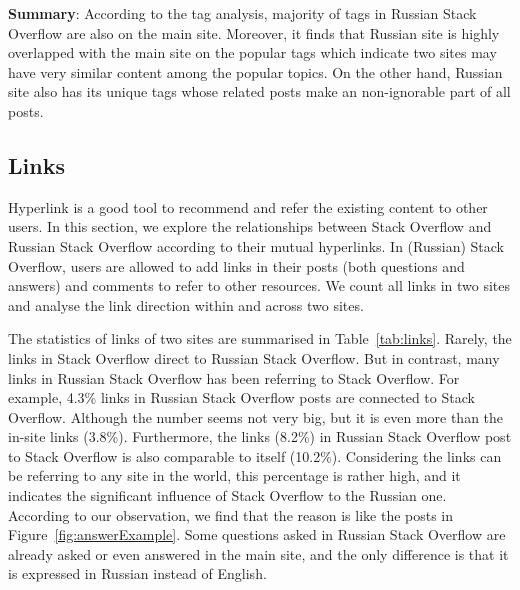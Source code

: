 \textbf{Summary}:
According to the tag analysis, majority of tags in Russian Stack Overflow are also on the main site. Moreover, it finds that Russian site is highly overlapped with the main site on the popular tags which indicate two sites may have very similar content among the popular topics. On the other hand, Russian site also has its unique tags whose related posts make an non-ignorable part of all posts. 


\subsection{Links}
Hyperlink is a good tool to recommend and refer the existing content to other users. 
In this section, we explore the relationships between Stack Overflow and Russian Stack Overflow according to their mutual hyperlinks. 
In (Russian) Stack Overflow, users are allowed to add links in their posts (both questions and answers) and comments to refer to other resources. 
We count all links in two sites and analyse the link direction within and across two sites.


The statistics of links of two sites are summarised in Table~\ref{tab:links}.
Rarely, the links in Stack Overflow direct to Russian Stack Overflow.
But in contrast, many links in Russian Stack Overflow has been referring to Stack Overflow.
For example, 4.3\% links in Russian Stack Overflow posts are connected to Stack Overflow.
Although the number seems not very big, but it is even more than the in-site links (3.8\%).
Furthermore, the links (8.2\%) in Russian Stack Overflow post to Stack Overflow is also comparable to itself (10.2\%).
Considering the links can be referring to any site in the world, this percentage is rather high, and it indicates the significant influence of Stack Overflow to the Russian one.
According to our observation, we find that the reason is like the posts in Figure~\ref{fig:answerExample}.
Some questions asked in Russian Stack Overflow are already asked or even answered in the main site, and the only difference is that it is expressed in Russian instead of English.

